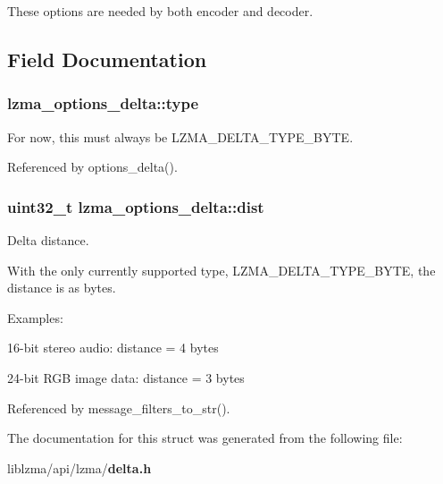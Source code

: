 These options are needed by both encoder and decoder. 

\subsection{Field Documentation}
\subsubsection[{type}]{ lzma\-\_\-options\-\_\-delta\-::type}\label{structlzma__options__delta_af3f1ece7f8c472f4a794953b414c7cd7}
For now, this must always be L\-Z\-M\-A\-\_\-\-D\-E\-L\-T\-A\-\_\-\-T\-Y\-P\-E\-\_\-\-B\-Y\-T\-E. 

Referenced by options\-\_\-delta().

\subsubsection[{dist}]{\setlength{\rightskip}{0pt plus 5cm}uint32\-\_\-t lzma\-\_\-options\-\_\-delta\-::dist}\label{structlzma__options__delta_a31b4b0b5a2462cb9433c2663b8a62790}


Delta distance. 

With the only currently supported type, L\-Z\-M\-A\-\_\-\-D\-E\-L\-T\-A\-\_\-\-T\-Y\-P\-E\-\_\-\-B\-Y\-T\-E, the distance is as bytes.

Examples\-:
\begin{DoxyItemize}
\item 16-\/bit stereo audio\-: distance = 4 bytes
\item 24-\/bit R\-G\-B image data\-: distance = 3 bytes 
\end{DoxyItemize}

Referenced by message\-\_\-filters\-\_\-to\-\_\-str().



The documentation for this struct was generated from the following file\-:\begin{DoxyCompactItemize}
\item 
liblzma/api/lzma/{\bf delta.\-h}\end{DoxyCompactItemize}
